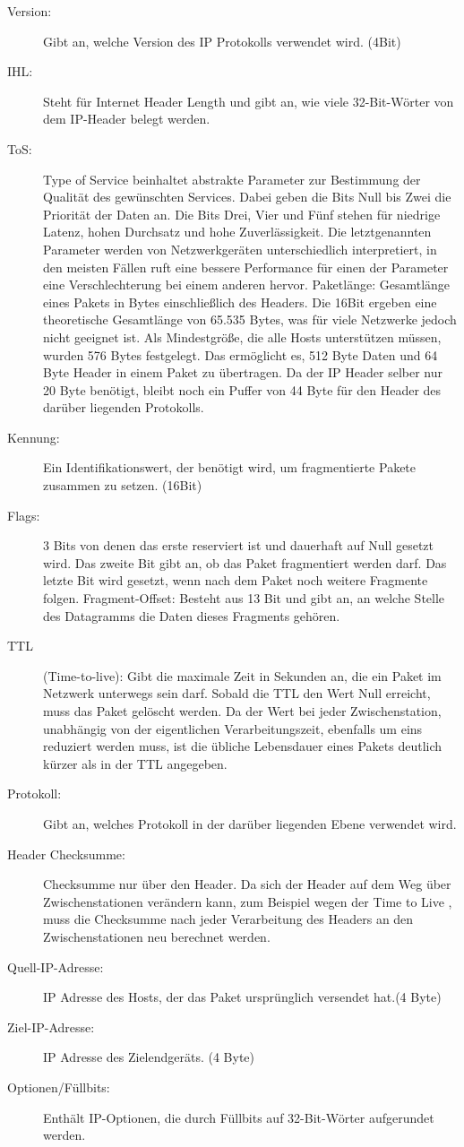 \begin{description}
\item[Version: ]Gibt an, welche Version des IP Protokolls verwendet wird. (4Bit)
\item[IHL: ]Steht für Internet Header Length und gibt an, wie viele 32-Bit-Wörter von dem IP-Header belegt werden.
\item[ToS: ]Type of Service beinhaltet abstrakte Parameter zur Bestimmung der Qualität des gewünschten Services. Dabei geben die Bits Null bis Zwei die Priorität der Daten an. Die Bits Drei, Vier und Fünf stehen für niedrige Latenz, hohen Durchsatz und hohe Zuverlässigkeit. Die letztgenannten Parameter werden von Netzwerkgeräten unterschiedlich interpretiert, in den meisten Fällen ruft eine bessere Performance für einen der Parameter eine Verschlechterung bei einem anderen hervor.
Paketlänge: Gesamtlänge eines Pakets in Bytes einschließlich des Headers. Die 16Bit ergeben eine theoretische Gesamtlänge von 65.535 Bytes, was für viele Netzwerke jedoch nicht geeignet ist. Als Mindestgröße, die alle Hosts unterstützen müssen, wurden 576 Bytes festgelegt. Das ermöglicht es, 512 Byte Daten und 64 Byte Header in einem Paket zu übertragen. Da der IP Header selber nur 20 Byte benötigt, bleibt noch ein Puffer von 44 Byte für den Header des darüber liegenden Protokolls.  
\item[Kennung: ]Ein Identifikationswert, der benötigt wird, um fragmentierte Pakete zusammen zu setzen.  (16Bit) 
\item[Flags: ]3 Bits von denen das erste reserviert ist und dauerhaft auf Null gesetzt wird. Das zweite Bit gibt an, ob das Paket fragmentiert werden darf. Das letzte Bit wird gesetzt, wenn nach dem Paket noch weitere Fragmente folgen.
Fragment-Offset: Besteht aus 13 Bit und gibt an, an welche Stelle des Datagramms die Daten dieses Fragments gehören. 
\item[TTL ](Time-to-live): Gibt die maximale Zeit in Sekunden an, die ein Paket im Netzwerk unterwegs sein darf. Sobald die TTL den Wert Null erreicht, muss das Paket gelöscht werden. Da der Wert bei jeder Zwischenstation, unabhängig von der eigentlichen Verarbeitungszeit, ebenfalls um eins reduziert werden muss, ist die übliche Lebensdauer eines Pakets deutlich kürzer als in der TTL angegeben. 
\item[Protokoll: ]Gibt an, welches Protokoll in der darüber liegenden Ebene verwendet wird.
\item[Header Checksumme: ]Checksumme nur über den Header. Da sich der Header auf dem Weg über Zwischenstationen verändern kann, zum Beispiel wegen der Time to Live , muss die Checksumme nach jeder Verarbeitung des Headers an den Zwischenstationen neu berechnet werden.
\item[Quell-IP-Adresse: ]IP Adresse des Hosts, der das Paket ursprünglich versendet hat.(4 Byte)
\item[Ziel-IP-Adresse: ]IP Adresse des Zielendgeräts. (4 Byte)
\item[Optionen/Füllbits: ] Enthält IP-Optionen, die durch Füllbits auf 32-Bit-Wörter aufgerundet werden.
\end{description}

